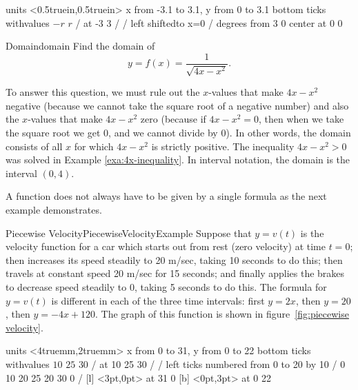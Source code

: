 \figure[!ht]
\centerline{\vbox{\beginpicture
\normalgraphs
\setcoordinatesystem units <0.5truein,0.5truein>
\setplotarea x from -3.1 to 3.1, y from 0 to 3.1
\axis bottom ticks withvalues {$-r$} {$r$} / at -3 3 / /
\axis left shiftedto x=0 /
 degrees from 3 0 center at 0 0
\endpicture}}
\caption{Upper semicircle $y=\sqrt{r^2- x^2}$. \label{fig:upper semicircle}}
\endfigure

\begin{example}{Domain}{domain}
Find the domain of 
$$ y=f(x)={\frac{1}{\sqrt{4x-x^2}}}.$$
\vspace{-0.5cm}
\end{example}

\begin{solution} 
To answer this question, we must rule out the $x$-values that make
$4x-x^2$ negative (because we cannot take the square root of a
negative number)
and also the $x$-values that make $4x-x^2$ zero (because if $4x-x^2=0$, then
when we take the square root we get 0, and we cannot divide by 0).
In other words, the domain consists of all $x$ for which $4x-x^2$ is
strictly positive.  The inequality $4x-x^2>0$ was solved in Example \ref{exa:4x-inequality}.
In interval notation, the domain is the interval $(0,4)$.
\end{solution}

A function does not always have to be given by a single formula as the next example demonstrates.

\begin{example}{Piecewise Velocity}{PiecewiseVelocityExample}
Suppose that $y=v(t)$ is the velocity function for a car
which starts out from rest (zero velocity) at time $t=0$; then
increases its speed steadily to 20 m/sec, taking 10 seconds to do
this; then travels at constant speed 20 m/sec for 15 seconds; and
finally applies the brakes to decrease speed steadily to 0, taking 5
seconds to do this.  The formula for $y=v(t)$ is different in each of
the three time intervals: first $y=2x$, then $y=20$, then $y=-4x+120$.
The graph of this function is shown in figure~\ref{fig:piecewise velocity}.
\end{example}

\figure[!ht]
\centerline{\vbox{\beginpicture
\normalgraphs
\setcoordinatesystem units <4truemm,2truemm>
\setplotarea x from 0 to 31, y from 0 to 22
\axis bottom ticks withvalues {$10$} {$25$} {$30$} / at 10 25 30 / /
\axis left ticks numbered from 0 to 20 by 10 /
 0 10 20 25 20 30 0 /
 [l] <3pt,0pt> at 31 0
 [b] <0pt,3pt> at 0 22
\endpicture}}
\caption{A velocity function. \label{fig:piecewise velocity}}
\endfigure


